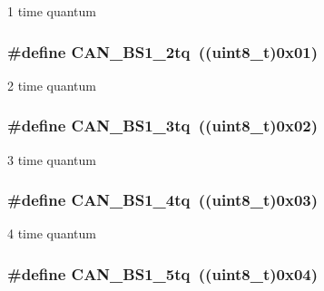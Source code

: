 \label{group__CAN__time__quantum__in__bit__segment__1_ga76b8fb0815b7a3f398fffe72dda0bc04}
1 time quantum \hypertarget{group__CAN__time__quantum__in__bit__segment__1_ga1544ecf902e6173859d60cff9530971a}{
\subsubsection[{CAN\_\-BS1\_\-2tq}]{\setlength{\rightskip}{0pt plus 5cm}\#define CAN\_\-BS1\_\-2tq~((uint8\_\-t)0x01)}}
\label{group__CAN__time__quantum__in__bit__segment__1_ga1544ecf902e6173859d60cff9530971a}
2 time quantum \hypertarget{group__CAN__time__quantum__in__bit__segment__1_gaa808099663480de935d3ce9187c2dcab}{
\subsubsection[{CAN\_\-BS1\_\-3tq}]{\setlength{\rightskip}{0pt plus 5cm}\#define CAN\_\-BS1\_\-3tq~((uint8\_\-t)0x02)}}
\label{group__CAN__time__quantum__in__bit__segment__1_gaa808099663480de935d3ce9187c2dcab}
3 time quantum \hypertarget{group__CAN__time__quantum__in__bit__segment__1_ga7c5c668200f41991e14b31ca20235000}{
\subsubsection[{CAN\_\-BS1\_\-4tq}]{\setlength{\rightskip}{0pt plus 5cm}\#define CAN\_\-BS1\_\-4tq~((uint8\_\-t)0x03)}}
\label{group__CAN__time__quantum__in__bit__segment__1_ga7c5c668200f41991e14b31ca20235000}
4 time quantum \hypertarget{group__CAN__time__quantum__in__bit__segment__1_ga31dea95492dababfcf79bcaeb884b99e}{
\subsubsection[{CAN\_\-BS1\_\-5tq}]{\setlength{\rightskip}{0pt plus 5cm}\#define CAN\_\-BS1\_\-5tq~((uint8\_\-t)0x04)}}
